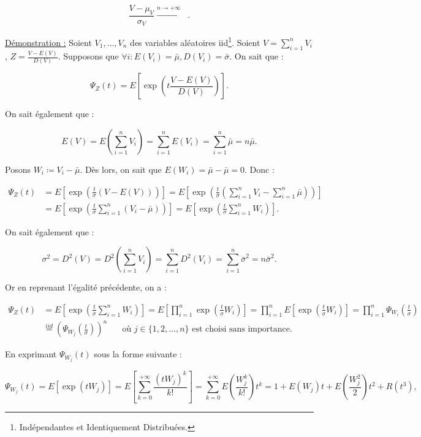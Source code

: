 \documentclass{article}
\DeclareMathOperator{\Nzo}{\mathcal N(0, 1)}
\begin{document}
		\[\frac {V - \mu_V}{\sigma_V} \stackrel{n \to +\infty}{\longrightarrow} \Nzo.\]

		\underline{Démonstration :} Soient $V_1, \ldots, V_n$ des variables aléatoires iid\footnote{Indépendantes et Identiquement Distribuées.}. Soient $V = \sum_{i=1}^nV_i$,
		$Z = \frac {V - E(V)}{D(V)}$. Supposons que $\forall i : E(V_i) = \bar \mu, D(V_i) = \bar \sigma$. On sait que :

		\[\Psi_Z(t) = E\left[\exp\left(t\frac {V-E(V)}{D(V)}\right)\right].\]

		On sait également que :

		\[E(V) = E\left(\sum_{i=1}^nV_i\right) = \sum_{i=1}^nE(V_i) = \sum_{i=1}^n\bar \mu = n\bar \mu.\]

		Posons $W_i \coloneqq V_i - \bar \mu$. Dès lors, on sait que $E(W_i) = \bar \mu - \bar \mu = 0$. Donc :

		\begin{align*}
			\Psi_Z(t) &= E\left[ \exp\left(\frac t\sigma(V-E(V))\right) \right] = E\left[ \exp\left(\frac t\sigma \left(\sum_{i=1}^nV_i - \sum_{i=1}^n\bar\mu\right)\right) \right] \\
	                  &= E\left[ \exp\left(\frac t\sigma \sum_{i=1}^n(V_i-\bar\mu)\right) \right] = E\left[ \exp\left(\frac t\sigma\sum_{i=1}^nW_i\right) \right].
		\end{align*}

		On sait également que :

		\[\sigma^2 = D^2(V) = D^2\left(\sum_{i=1}^nV_i\right) = \sum_{i=1}^nD^2(V_i) = \sum_{i=1}^n\bar\sigma^2 = n\bar\sigma^2.\]

		Or en reprenant l'égalité précédente, on a :

		\begin{align*}
			\Psi_Z(t) &= E\left[ \exp\left(\frac t\sigma \sum_{i=1}^nW_i\right) \right] = E\left[ \prod_{i=1}^n\exp\left(\frac t\sigma W_i\right) \right] =
			\prod_{i=1}^nE\left[ \exp\left(\frac t\sigma W_i\right) \right] = \prod_{i=1}^n\Psi_{W_i}\left(\frac t\sigma\right) \\
		              &\stackrel{iid}= \left(\Psi_{W_j}\left(\frac t\sigma\right)\right)^n \;\;\;\;\;\text{ où $j \in \{1, 2, \ldots, n\}$ est choisi sans importance}.
		\end{align*}

		En exprimant $\Psi_{W_j}(t)$ sous la forme suivante :

		\[\Psi_{W_j}(t) = E[\exp(tW_j)] = E\left[\sum_{k=0}^{+\infty}\frac {(tW_j)^k}{k!}\right] = \sum_{k=0}^{+\infty}E\left(\frac {W_j^k}{k!}\right)t^k = 1 + E(W_j)t + E\left(\frac {W_j^2}2\right)t^2 + R(t^3),\]
\end{document}
